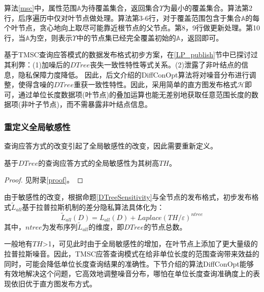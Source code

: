 算法\ref{msc}中，属性范围$\mathbb{A}$为待覆盖集合，返回集合$\Upsilon$为最小的覆盖集合。算法第2行，后序遍历中仅对叶节点做处理。算法第3-6行，对于覆盖范围包含于集合$\mathbb{A}$的每个叶节点，贪心地向上取尽可能靠近根节点的父节点。第8，9行做更新处理。第10行，当$\mathbb{A}$为空，则表示$\Upsilon$中的节点集已经完全覆盖初始的$\mathbb{A}$，返回即可。

基于TMSC查询应答模式的数据发布格式初步方案，在\ref{LP_publish}节中已探讨过其利弊：(1)加噪后的$DTree$丧失一致性特性等式关系。(2)泄露了非叶结点的信息，隐私保障力度降低。
因此，后文介绍的DiffConOpt算法将对噪音分布进行调整，使得含噪的$DTree$重获一致性特性。因此，采用简单的直方图发布格式$\mathcal{H}$即可，通过单位长度数据项(叶节点)的叠加运算也能无差别地获取任意范围长度的数据项(非叶子节点)，而不需暴露非叶结点信息。

\subsubsection{重定义全局敏感性}

查询应答方式的改变引起了全局敏感性的改变，因此需要重新定义。

\begin{prop}
	\label{DTreeSensitivity}
	基于$DTree$的查询应答方式的全局敏感性为其树高$TH$。
\end{prop}
\begin{proof}
	见附录\ref{proof}。
\end{proof}

由于敏感性的改变，根据命题\ref{DTreeSensitivity}与全节点的发布格式，初步发布格式$\tilde{L}_{all}$基于拉普拉斯机制的差分隐私算法具体化为：
\begin{equation}
\label{chap4_dtree}
\tilde{L}_{all}(D) = L_{all}(D) + \textit{Laplace}(TH/\varepsilon)^{ntree}
\end{equation}
其中，$ntree$为发布序列$\tilde{L}_{all}$的维度，即$DTree$的节点总数。

一般地有$TH$>1，可见此时由于全局敏感性的增加，在叶节点上添加了更大量级的拉普拉斯噪音。因此，TMSC应答查询模式在给非单位长度的范围查询带来效益的同时，可能会降低单位长度查询结果的准确性。下节介绍的算法DiffConOpt能够有效地解决这个问题，它高效地调整噪音分布，哪怕在单位长度查询准确度上的表现依旧优于直方图发布方式。




